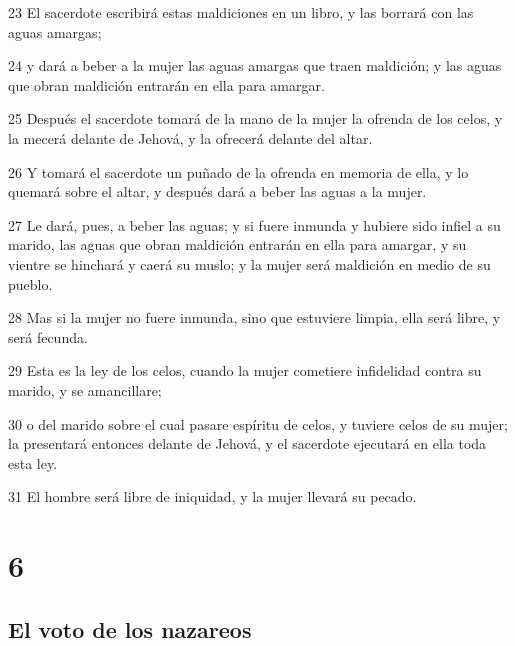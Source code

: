 \par 23 El sacerdote escribirá estas maldiciones en un libro, y las borrará con las aguas amargas;
\par 24 y dará a beber a la mujer las aguas amargas que traen maldición; y las aguas que obran maldición entrarán en ella para amargar.
\par 25 Después el sacerdote tomará de la mano de la mujer la ofrenda de los celos, y la mecerá delante de Jehová, y la ofrecerá delante del altar.
\par 26 Y tomará el sacerdote un puñado de la ofrenda en memoria de ella, y lo quemará sobre el altar, y después dará a beber las aguas a la mujer.
\par 27 Le dará, pues, a beber las aguas; y si fuere inmunda y hubiere sido infiel a su marido, las aguas que obran maldición entrarán en ella para amargar, y su vientre se hinchará y caerá su muslo; y la mujer será maldición en medio de su pueblo.
\par 28 Mas si la mujer no fuere inmunda, sino que estuviere limpia, ella será libre, y será fecunda.
\par 29 Esta es la ley de los celos, cuando la mujer cometiere infidelidad contra su marido, y se amancillare;
\par 30 o del marido sobre el cual pasare espíritu de celos, y tuviere celos de su mujer; la presentará entonces delante de Jehová, y el sacerdote ejecutará en ella toda esta ley.
\par 31 El hombre será libre de iniquidad, y la mujer llevará su pecado.

\chapter{6}

\section*{El voto de los nazareos}

